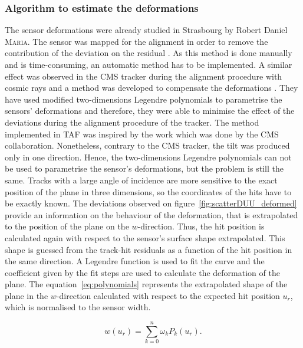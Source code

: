       \subsubsection{Algorithm to estimate the deformations}

      The sensor deformations were already studied in Strasbourg by Robert Daniel \textsc{Maria}.
      The sensor was mapped for the alignment in order to remove the contribution of the deviation on the residual \cite{maria}.
      As this method is done manually and is time-consuming, an automatic method has to be implemented.
      A similar effect was observed in the CMS tracker during the alignment procedure with cosmic rays and a method was developed to compensate the deformations \cite{CMSalignment}. 
      They have used modified two-dimensions Legendre polynomials to parametrise the sensors' deformations and therefore, they were able to minimise the effect of the deviations during the alignment procedure of the tracker.
      The method implemented in TAF was inspired by the work which was done by the CMS collaboration.
      Nonetheless, contrary to the CMS tracker, the tilt was produced only in one direction.
      Hence, the two-dimensions Legendre polynomials can not be used to parametrise the sensor's deformations, but the problem is still the same.
      Tracks with a large angle of incidence are more sensitive to the exact position of the plane in three dimensions, so the coordinates of the hits have to be exactly known.
      The deviations observed on figure~\ref{fig:scatterDUU_deformed} provide an information on the behaviour of the deformation, that is extrapolated to the position of the plane on the $w$-direction.
      Thus, the hit position is calculated again with respect to the sensor's surface shape extrapolated.
      This shape is guessed from the track-hit residuals as a function of the hit position in the same direction.
      A Legendre function is used to fit the curve and the coefficient given by the fit steps are used to calculate the deformation of the plane.
      The equation~\ref{eq:polynomials} represents the extrapolated shape of the plane in the $w$-direction calculated with respect to the expected hit position $u_{r}$, which is normalised to the sensor width.

      \begin{equation}
        w\left(u_{r}\right) = \sum_{k=0}^n \omega_{k}P_{k}\left(u_{r}\right).
        \label{eq:polynomials}
      \end{equation}
      
